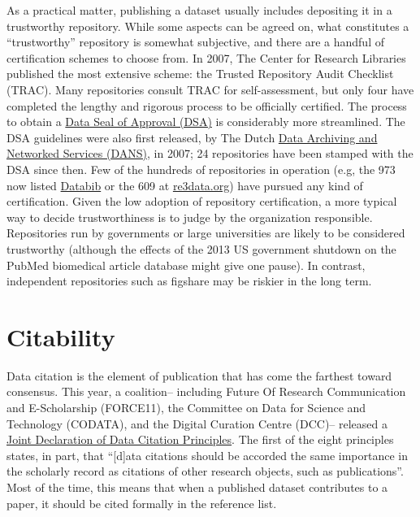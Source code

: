 \documentclass[10pt,twocolumn]{article}
\begin{document}
As a practical matter, publishing a dataset usually includes depositing it in a trustworthy repository.
While some aspects can be agreed on, what constitutes a ``trustworthy'' repository is somewhat subjective, and there are a handful of certification schemes to choose from.
In 2007, The Center for Research Libraries published the most extensive scheme: the Trusted Repository Audit Checklist (TRAC)\cite{dale_trustworthy_2007}.
Many repositories consult TRAC for self-assessment, but only four have completed the lengthy and rigorous process to be officially certified.
The process to obtain a \href{http://datasealofapproval.org/}{Data Seal of Approval (DSA)} is considerably more streamlined.
The DSA guidelines were also first released, by The Dutch \href{http://www.dans.knaw.nl/en}{Data Archiving and Networked Services (DANS)}, in 2007; 24 repositories have been stamped with the DSA since then.
Few of the hundreds of repositories in operation (e.g, the 973 now listed \href{http://databib.org/}{Databib} or the 609 at \href{http://www.re3data.org/}{re3data.org}) have pursued any kind of certification.
Given the low adoption of repository certification, a more typical way to decide trustworthiness is to judge by the organization responsible.
Repositories run by governments or large universities are likely to be considered trustworthy (although the effects of the 2013 US government shutdown on the PubMed biomedical article database\cite{check-hayden_nih_2013} might give one pause).
In contrast, independent repositories such as figshare may be riskier in the long term.

\section*{Citability}\label{citability}

Data citation is the element of publication that has come the farthest toward consensus.
This year, a coalition– including Future Of Research Communication and E-Scholarship (FORCE11)\cite{bourne_improving_2012}, the Committee on Data for Science and Technology (CODATA)\cite{codata-icsti_task_group_on_data_citation_standards_and_practices_out_2013}, and the Digital Curation Centre (DCC)– released a \href{http://www.force11.org/datacitation}{Joint Declaration of Data Citation Principles}.
The first of the eight principles states, in part, that ``[d]ata citations should be accorded the same importance in the scholarly record as citations of other research objects, such as publications''.
Most of the time, this means that when a published dataset contributes to a paper, it should be cited formally in the reference list.
	
\end{document}
